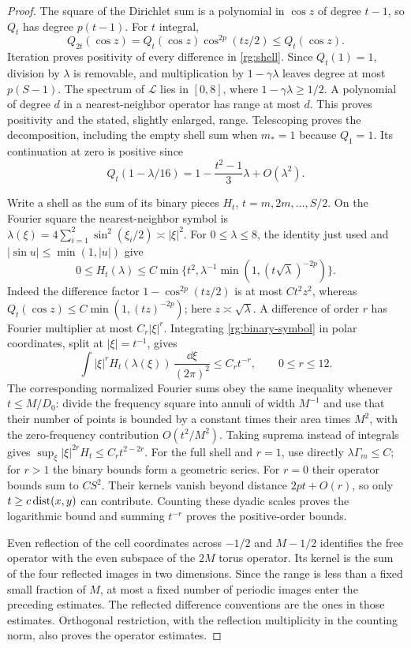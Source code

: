 \begin{proof}
The square of the Dirichlet sum is a polynomial in $\cos z$ of degree $t-1$, so $Q_t$ has degree $p(t-1)$.  For $t$ integral,
\[
 Q_{2t}(\cos z)=Q_t(\cos z)\cos^{2p}(tz/2)\le Q_t(\cos z).
\]
Iteration proves positivity of every difference in \eqref{rg:shell}.  Since $Q_t(1)=1$, division by $\lambda$ is removable, and multiplication by $1-\gamma\lambda$ leaves degree at most $p(S-1)$.  The spectrum of $\mathcal L$ lies in $[0,8]$, where $1-\gamma\lambda\ge1/2$.  A polynomial of degree $d$ in a nearest-neighbor operator has range at most $d$.  This proves positivity and the stated, slightly enlarged, range.  Telescoping proves the decomposition, including the empty shell sum when $m_*=1$ because $Q_1=1$.  Its continuation at zero is positive since
\[
 Q_t(1-\lambda/16)=1-\frac{t^2-1}{3}\lambda+O(\lambda^2).
\]

Write a shell as the sum of its binary pieces $H_t$, $t=m,2m,\ldots,S/2$.  On the Fourier square the nearest-neighbor symbol is
$\lambda(\xi)=4\sum_{i=1}^2\sin^2(\xi_i/2)\asymp |\xi|^2$.
For $0\le\lambda\le8$, the identity just used and $|\sin u|\le\min(1,|u|)$ give
\begin{equation}\label{rg:binary-symbol}
 0\le H_t(\lambda)\le C\min\{t^2,\lambda^{-1}\min(1,(t\sqrt\lambda)^{-2p})\}.
\end{equation}
Indeed the difference factor $1-\cos^{2p}(tz/2)$ is at most $Ct^2z^2$, whereas $Q_t(\cos z)\le C\min(1,(tz)^{-2p})$; here $z\asymp\sqrt\lambda$.  A difference of order $r$ has Fourier multiplier at most $C_r|\xi|^r$.  Integrating \eqref{rg:binary-symbol} in polar coordinates, split at $|\xi|=t^{-1}$, gives
\[
 \int |\xi|^r H_t(\lambda(\xi))\,\frac{\dd\xi}{(2\pi)^2}\le C_rt^{-r},\qquad0\le r\le12.
\]
The corresponding normalized Fourier sums obey the same inequality whenever $t\le M/D_0$: divide the frequency square into annuli of width $M^{-1}$ and use that their number of points is bounded by a constant times their area times $M^2$, with the zero-frequency contribution $O(t^2/M^2)$.  Taking suprema instead of integrals gives
$\sup_\xi |\xi|^{2r}H_t\le C_rt^{2-2r}$.
For the full shell and $r=1$, use directly $\lambda\Gamma_m\le C$; for $r>1$ the binary bounds form a geometric series.  For $r=0$ their operator bounds sum to $CS^2$.  Their kernels vanish beyond distance $2pt+O(r)$, so only $t\ge c\operatorname{dist}(x,y)$ can contribute.  Counting these dyadic scales proves the logarithmic bound and summing $t^{-r}$ proves the positive-order bounds.

Even reflection of the cell coordinates across $-1/2$ and $M-1/2$ identifies the free operator with the even subspace of the $2M$ torus operator.  Its kernel is the sum of the four reflected images in two dimensions.  Since the range is less than a fixed small fraction of $M$, at most a fixed number of periodic images enter the preceding estimates.  The reflected difference conventions are the ones in those estimates.  Orthogonal restriction, with the reflection multiplicity in the counting norm, also proves the operator estimates.


\end{proof}
